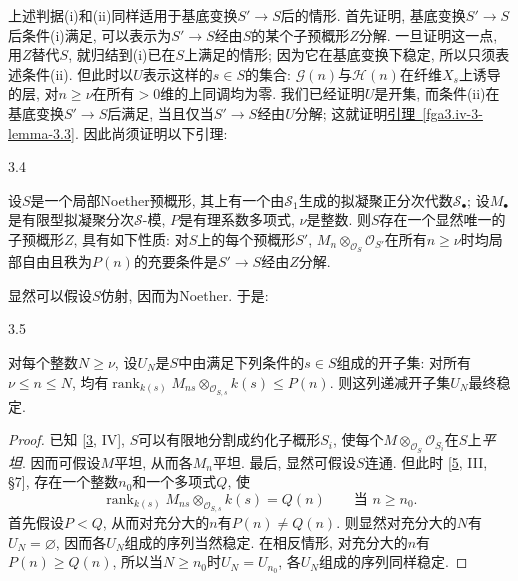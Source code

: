 \par{}上述判据(i)和(ii)同样适用于基底变换\(S'\to  S\)后的情形. 首先证明, 基底变换\(S'\to  S\)后条件(i)满足, 可以表示为\(S'\to  S\)经由\(S\)的某个子预概形\(Z\)分解. 一旦证明这一点, 用\(Z\)替代\(S\), 就归结到(i)已在\(S\)上满足的情形; 因为它在基底变换下稳定, 所以只须表述条件(ii). 但此时以\(U\)表示这样的\(s\in  S\)的集合: \(\mathscr {G} (n)\)与\(\mathscr {H} (n)\)在纤维\(X_s\)上诱导的层, 对\(n\geqslant \nu \)在所有\(>0\)维的上同调均为零. 我们已经证明\(U\)是开集, 而条件(ii)在基底变换\(S'\to  S\)后满足, 当且仅当\(S'\to  S\)经由\(U\)分解; 这就证明\hyperref[fga3.iv-3-lemma-3.3]{引理~\ref*{fga3.iv-3-lemma-3.3}}. 因此尚须证明以下引理:
\begin{lemma}{3.4}\label{fga3.iv-3-lemma-3.4}\skipsinglepar
\par{}设\(S\)是一个局部Noether预概形, 其上有一个由\(\mathcal {S}_1\)生成的拟凝聚正分次代数\(\mathcal {S}_\bullet \); 设\(M_\bullet \)是有限型拟凝聚分次\(\mathcal {S}\)-模, \(P\)是有理系数多项式, \(\nu \)是整数. 则\(S\)存在一个显然唯一的子预概形\(Z\), 具有如下性质: 对\(S\)上的每个预概形\(S'\), \(M_n\otimes _{\mathcal {O}_S}\mathcal {O}_{S'}\)在所有\(n\geqslant \nu \)时均局部自由且秩为\(P(n)\)的充要条件是\(S'\to  S\)经由\(Z\)分解.
\end{lemma}
\par{}显然可以假设\(S\)仿射, 因而为Noether. 于是:
\begin{lemma}{3.5}\label{fga3.iv-3-lemma-3.5}\skipsinglepar
\par{}对每个整数\(N\geqslant \nu \), 设\(U_N\)是\(S\)中由满足下列条件的\(s\in  S\)组成的开子集: 对所有\(\nu \leqslant  n\leqslant  N\), 均有\(\operatorname {rank}_{k(s)}M_{ns}\otimes _{\mathcal {O}_{S,s}} k(s)\leqslant  P(n)\). 则这列递减开子集\(U_N\)最终稳定.
\begin{proof}
\par{}已知 [\hyperref[Gro1960b]{3}, IV], \(S\)可以有限地分割成约化子概形\(S_i\), 使每个\(M\otimes _{\mathcal {O}_S}\mathcal {O}_{S_i}\)在\(S\)上\emph{平坦}. 因而可假设\(M\)平坦, 从而各\(M_n\)平坦. 最后, 显然可假设\(S\)连通. 但此时 [\hyperref[GD1960]{5}, III, §7], 存在一个整数\(n_0\)和一个多项式\(Q\), 使\[         \operatorname {rank}_{k(s)}M_{ns}\otimes _{\mathcal {O}_{S,s}} k(s)         = Q(n)         \qquad \text {当 } n\geqslant  n_0.\] 首先假设\(P<Q\), 从而对充分大的\(n\)有\(P(n)\neq  Q(n)\). 则显然对充分大的\(N\)有\(U_N=\varnothing \), 因而各\(U_N\)组成的序列当然稳定. 在相反情形, 对充分大的\(n\)有\(P(n)\geqslant  Q(n)\), 所以当\(N\geqslant  n_0\)时\(U_N=U_{n_0}\), 各\(U_N\)组成的序列同样稳定.
\end{proof}
\end{lemma}
